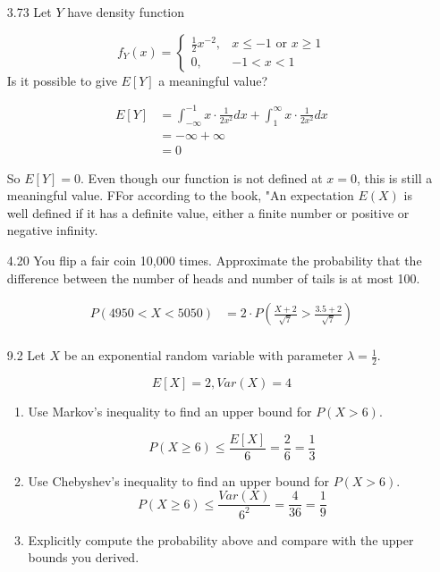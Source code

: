 \documentclass[10pt]{article}
\begin{document}
\begin{itemize}
\newpage
    \item[3.73]  Let $Y$ have density function

    \[ f_{Y}(x)=
      \begin{cases}
        \frac{1}{2} x^{-2}, & x \leq-1 \text { or } x \geq 1 \\
       0, & -1<x<1
     \end{cases}
      \]
    Is it possible to give $E[Y]$ a meaningful value?

    \begin{align*}
      E[Y] &= \int_{-\infty}^{-1} x \cdot \frac{1}{2x^2} d{x} + \int_{1}^{\infty} x \cdot \frac{1}{2x^2} d{x} \\
          &= -\infty + \infty \\
          &= 0
    \end{align*}

    So $E[Y]=0$.  Even though our function is not defined at $x=0$, 
    this is still a meaningful value.  FFor according to the book,
    "An expectation $E(X)$ is well defined if it has a definite value,
    either a finite number or positive or negative infinity.


\newpage
    \item[4.20]  You flip a fair coin 10,000 times. Approximate the probability that the difference between the number of heads and number of tails is at most 100.

        \begin{align*}
          P\left(4950 < X < 5050\right) &= 2 \cdot P\left(\frac{X+2}{\sqrt{7}}  > \frac{3.5+2}{\sqrt{7}}\right)\\
        \end{align*}

\newpage
    \item[9.2]  Let $X$ be an exponential random variable with parameter $\lambda=\frac{1}{2}$.

      \[ E[X] = 2, Var(X) = 4 \]
    \begin{enumerate}
      \item  Use Markov's inequality to find an upper bound for $P(X>6)$.

        \[ P(X \geq 6) \leq \frac{E[X]}{6} = \frac{2}{6} = \frac{1}{3}  \]

      \item  Use Chebyshev's inequality to find an upper bound for $P(X>6)$.
        \[ P(X \geq 6) \leq \frac{Var(X)}{6^2} = \frac{4}{36} = \frac{1}{9}  \]

      \item  Explicitly compute the probability above and compare with the upper bounds you derived.


\end{enumerate}
\end{itemize}
\end{document}
